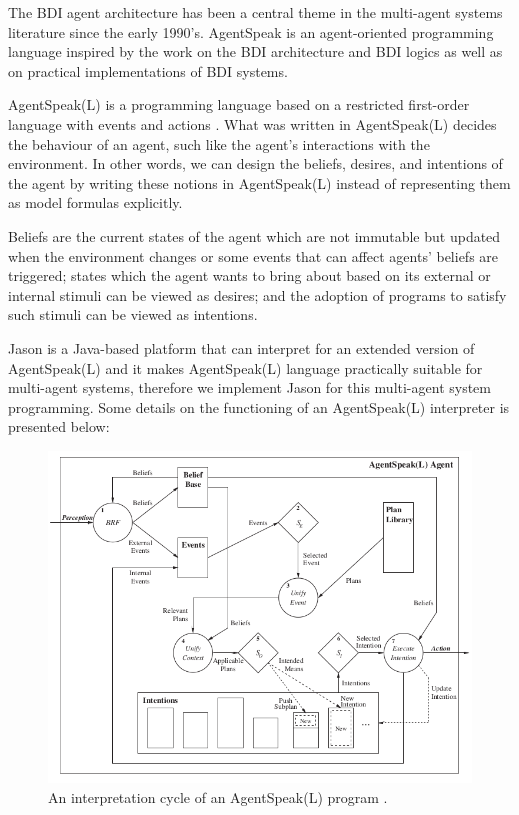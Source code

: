 The BDI agent architecture has been a central theme in the multi-agent systems literature since the early 1990’s. AgentSpeak is an agent-oriented programming language inspired by the work on the BDI architecture and BDI logics as well as on practical implementations of BDI systems\cite{rafael_BDIAgent_2005}.

AgentSpeak(L) is a programming language based on a restricted first-order language with events and actions \cite{anand_AgentSpeak_1996}. What was written in AgentSpeak(L) decides the behaviour of an agent, such like the agent's interactions with the environment. In other words, we can design the beliefs, desires, and intentions of the agent by writing these notions in AgentSpeak(L) instead of representing them as model formulas explicitly.

Beliefs are the current states of the agent which are not immutable but updated when the environment changes or some events that can affect agents' beliefs are triggered; states which the agent wants to bring about based on its external or internal stimuli can be viewed as desires; and the adoption of programs to satisfy such stimuli can be viewed as intentions\cite{anand_AgentSpeak_1996}.

Jason is a Java-based platform that can interpret for an extended version of AgentSpeak(L) and it makes AgentSpeak(L) language practically suitable for multi-agent systems, therefore we implement Jason for this multi-agent system programming. Some details on the functioning of an AgentSpeak(L) interpreter is presented below:

\begin{figure}[h]
  \centering
  \includegraphics[width=\textwidth]{images/BDI_ASL_interpreter}
  \caption{An interpretation cycle of an AgentSpeak(L) program \cite{rafael_BDIAgent_2005}.}
  \label{fig:ASL_interpreter}
\end{figure}

